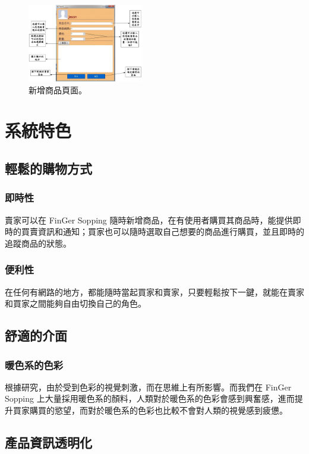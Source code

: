 \documentclass{scrreprt}
\begin{document}
\begin{CJK}{UTF8}{bkai}
\begin{figure}[t]
	\centering
	\includegraphics[width=0.45\textwidth]{addpro.pdf}
	\caption{新增商品頁面。}
\end{figure}

\chapter{系統特色}
\section{輕鬆的購物方式}

\subsection{即時性}
\qquad 賣家可以在 FinGer Sopping 隨時新增商品，在有使用者購買其商品時，能提供即時的買賣資訊和通知；買家也可以隨時選取自己想要的商品進行購買，並且即時的追蹤商品的狀態。

\subsection{便利性}
\qquad 在任何有網路的地方，都能隨時當起買家和賣家，只要輕鬆按下一鍵，就能在賣家和買家之間能夠自由切換自己的角色。


\section{舒適的介面}

\subsection{暖色系的色彩}
\qquad 根據研究，由於受到色彩的視覺刺激，而在思維上有所影響。而我們在 FinGer Sopping 上大量採用暖色系的顏料，人類對於暖色系的色彩會感到興奮感，進而提升買家購買的慾望，而對於暖色系的色彩也比較不會對人類的視覺感到疲憊。

\section{產品資訊透明化}

\end{CJK}
\end{document}
